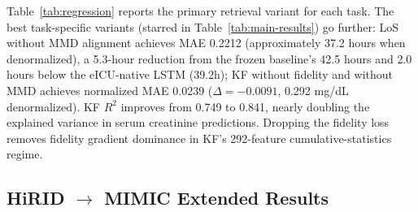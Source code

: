 \begin{table}[h]
\centering
\caption{Regression results across multiple metrics. Bootstrap 95\% CIs (500 replicates). MAE and RMSE: lower is better ($\downarrow$); $R^2$: higher is better ($\uparrow$).}
\label{tab:regression}
\end{table}

Table~\ref{tab:regression} reports the primary retrieval variant for each task. The best task-specific variants (starred in Table~\ref{tab:main-results}) go further: LoS without MMD alignment achieves MAE 0.2212 (approximately 37.2 hours when denormalized), a 5.3-hour reduction from the frozen baseline's 42.5 hours and 2.0 hours below the eICU-native LSTM (39.2h); KF without fidelity and without MMD achieves normalized MAE 0.0239 ($\Delta = -0.0091$, 0.292 mg/dL denormalized).
KF $R^2$ improves from 0.749 to 0.841, nearly doubling the explained variance in serum creatinine predictions.
Dropping the fidelity loss removes fidelity gradient dominance in KF's 292-feature cumulative-statistics regime.

\subsection{HiRID $\to$ MIMIC Extended Results}
\label{app:hirid}


